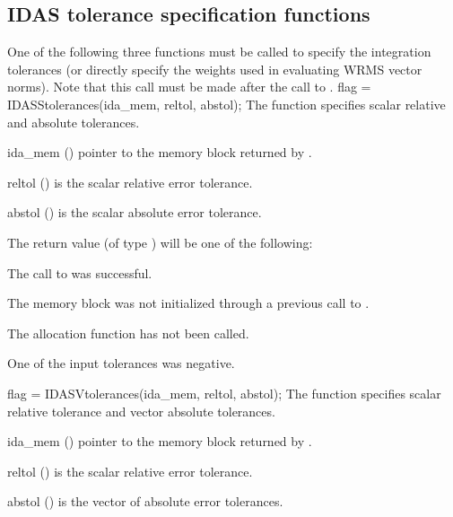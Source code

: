 \subsection{IDAS tolerance specification functions}\label{sss:idatolerances}
One of the following three functions must be called to specify the
integration tolerances (or directly specify the weights used in
evaluating WRMS vector norms).  Note that this call must be made after
the call to .
{
  flag = IDASStolerances(ida\_mem, reltol, abstol);
}
{
  The function  specifies scalar relative and absolute
  tolerances.
}
{
  \begin{args}
  \item[ida\_mem] ()
    pointer to the {\idas} memory block returned by .
  \item[reltol] ()
    is the scalar relative error tolerance.
  \item[abstol] ()
    is the scalar absolute error tolerance.
  \end{args}
}
{
  The return value  (of type ) will be one of the following:
  \begin{args}
  \item[\Id{IDA\_SUCCESS}]
    The call to  was successful.
  \item[\Id{IDA\_MEM\_NULL}]
    The {\idas} memory block was not initialized through a previous call to
    .
  \item[\Id{IDA\_NO\_MALLOC}]
    The allocation function  has not been called.
  \item[\Id{IDA\_ILL\_INPUT}]
    One of the input tolerances was negative.
  \end{args}
}
{}
{
  flag = IDASVtolerances(ida\_mem, reltol, abstol);
}
{
  The function  specifies scalar relative tolerance and
  vector absolute tolerances.
}
{
  \begin{args}
  \item[ida\_mem] ()
    pointer to the {\idas} memory block returned by .
  \item[reltol] ()
    is the scalar relative error tolerance.
  \item[abstol] ()
    is the vector of absolute error tolerances.
  \end{args}
}
